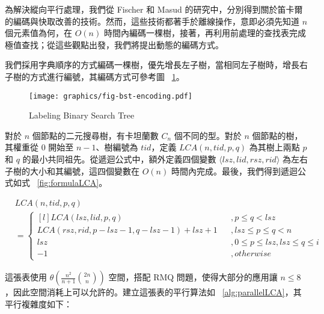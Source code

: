 \documentclass{gapd}
\begin{document}
為解決縱向平行處理，我們從 Fischer \cite{fischer} 和 Masud \cite{masud} 的研究中，分別得到關於笛卡爾的編碼與快取改善的技術。然而，這些技術都著手於離線操作，意即必須先知道 $n$ 個元素值為何，在 $O(n)$ 時間內編碼一棵樹，接著，再利用前處理的查找表完成極值查找；從這些觀點出發，我們將提出動態的編碼方式。

我們採用字典順序的方式編碼一棵樹，優先增長左子樹，當相同左子樹時，增長右子樹的方式進行編號，其編碼方式可參考圖 ~\ref{fig:lablingBST}。

\begin{figure}[!thb]
  \centering
  \texttt{[image: graphics/fig-bst-encoding.pdf]}
  \caption{Labeling Binary Search Tree}
  \label{fig:lablingBST}
\end{figure}

對於 $n$ 個節點的二元搜尋樹，有卡坦蘭數 $C_n$ 個不同的型。對於 $n$ 個節點的樹，其權重從 $0$ 開始至 $n-1$、樹編號為 $\mathit{tid}$，定義 $\mathit{LCA}(n, \mathit{tid}, p, q)$ 為其樹上兩點 $p$ 和 $q$ 的最小共同祖先。從遞迴公式中，額外定義四個變數 $\langle\mathit{lsz},\mathit{lid},\mathit{rsz},\mathit{rid}\rangle$ 為左右子樹的大小和其編號，這四個變數在 $O(n)$ 時間內完成。最後，我們得到遞迴公式如式 ~\ref{fig:formulaLCA}。 

\begin{figure*}[!thb]
\begin{equation*}
  \begin{split}
    &\mathit{LCA}(n, \mathit{tid}, p, q) \\
      &= \left\{\begin{matrix*}[l]
        \mathit{LCA}(\mathit{lsz}, \mathit{lid}, p, q) &&, p \le q < \mathit{lsz}\\ 
        \mathit{LCA}(\mathit{rsz}, \mathit{rid}, p-\mathit{lsz}-1, q-\mathit{lsz}-1)+\mathit{lsz}+1 &&, 
            \mathit{lsz} \le p \le q < n \\ 
        \mathit{lsz} && , 0 \le p \le \mathit{lsz}, \mathit{lsz} \le q \le i\\ 
        -1 && ,\mathit{otherwise}
      \end{matrix*}\right.
  \end{split}
\end{equation*}
\caption{Recursion Formula for labeling BST}
\label{fig:formulaLCA}
\end{figure*}

這張表使用 $\theta\left(\frac{n^2}{n+1} \binom{2n}{n}\right)$ 空間，搭配 RMQ 問題，使得大部分的應用讓 $n \le 8$，因此空間消耗上可以允許的。建立這張表的平行算法如 ~\ref{alg:parallelLCA}，其平行複雜度如下：
\end{document}
